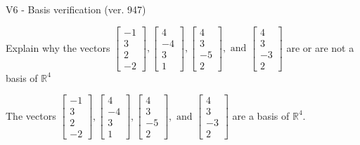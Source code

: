 \begin{exercise}
  \begin{exerciseTitle}V6 - Basis verification (ver. 947)\end{exerciseTitle}
  \begin{exerciseStatement}
    Explain why the vectors \(\left[\begin{array}{r}
-1 \\
3 \\
2 \\
-2
\end{array}\right] , \left[\begin{array}{r}
4 \\
-4 \\
3 \\
1
\end{array}\right] , \left[\begin{array}{r}
4 \\
3 \\
-5 \\
2
\end{array}\right] , \text{ and } \left[\begin{array}{r}
4 \\
3 \\
-3 \\
2
\end{array}\right]\) are or are not a basis of \(\mathbb{R}^4\)	


  \end{exerciseStatement}
  \begin{exerciseAnswer}
   The vectors \(\left[\begin{array}{r}
-1 \\
3 \\
2 \\
-2
\end{array}\right] , \left[\begin{array}{r}
4 \\
-4 \\
3 \\
1
\end{array}\right] , \left[\begin{array}{r}
4 \\
3 \\
-5 \\
2
\end{array}\right] , \text{ and } \left[\begin{array}{r}
4 \\
3 \\
-3 \\
2
\end{array}\right]\) 
  	 are  a basis of \(\mathbb{R}^4\).
  


  \end{exerciseAnswer}
\end{exercise}